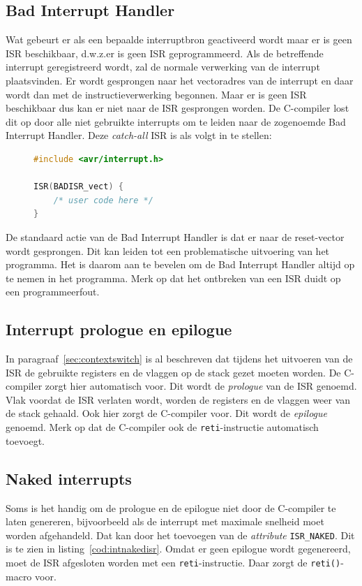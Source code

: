 \subsection{Bad Interrupt Handler}
Wat gebeurt er als een bepaalde interruptbron geactiveerd wordt maar er
is geen ISR beschikbaar, d.w.z.\@ er is geen ISR geprogrammeerd. Als
de betreffende interrupt geregistreerd wordt, zal de normale verwerking
van de interrupt plaatsvinden. Er wordt gesprongen naar het vectoradres
van de interrupt en daar wordt dan met de instructieverwerking begonnen.
Maar er is geen ISR beschikbaar dus kan er niet naar de ISR gesprongen
worden. De C-compiler lost dit op door alle niet gebruikte interrupts
om te leiden naar de zogenoemde Bad Interrupt Handler. Deze
\textsl{catch-all} ISR is als volgt in te stellen:

\begin{figure}[!ht]
\begin{lstlisting}[language=C,caption=De Bad Interrupt Handler.,label=cod:intbadisr]
#include <avr/interrupt.h>

ISR(BADISR_vect) {
	/* user code here */
}
\end{lstlisting}
\end{figure}

De standaard actie van de Bad Interrupt Handler is dat er naar de reset-vector
wordt gesprongen. Dit kan leiden tot een problematische uitvoering van het
programma. Het is daarom aan te bevelen om de Bad Interrupt Handler altijd
op te nemen in het programma. Merk op dat het ontbreken van een ISR duidt op
een programmeerfout.

\subsection{Interrupt prologue en epilogue}
In paragraaf~\ref{sec:contextswitch} is al beschreven dat tijdens het
uitvoeren van de ISR de gebruikte registers en de vlaggen op de stack
gezet moeten worden. De C-compiler zorgt hier automatisch voor. Dit wordt
de \textsl{prologue} van de ISR genoemd. Vlak voordat de ISR verlaten
wordt, worden de registers en de vlaggen weer van de stack gehaald.
Ook hier zorgt de C-compiler voor. Dit wordt de \textsl{epilogue}
genoemd. Merk op dat de C-compiler ook de \lstinline|reti|-instructie
automatisch toevoegt. 

\subsection{Naked interrupts}
Soms is het handig om de prologue en de epilogue niet door de C-compiler
te laten genereren, bijvoorbeeld als de interrupt met maximale snelheid
moet worden afgehandeld. Dat kan door het toevoegen van de \textsl{attribute}
\lstinline|ISR_NAKED|. Dit is te zien in listing~\ref{cod:intnakedisr}.
Omdat er geen epilogue wordt gegenereerd, moet de ISR afgesloten worden
met een \lstinline|reti|-instructie. Daar zorgt de
\lstinline|reti()|-macro voor.

